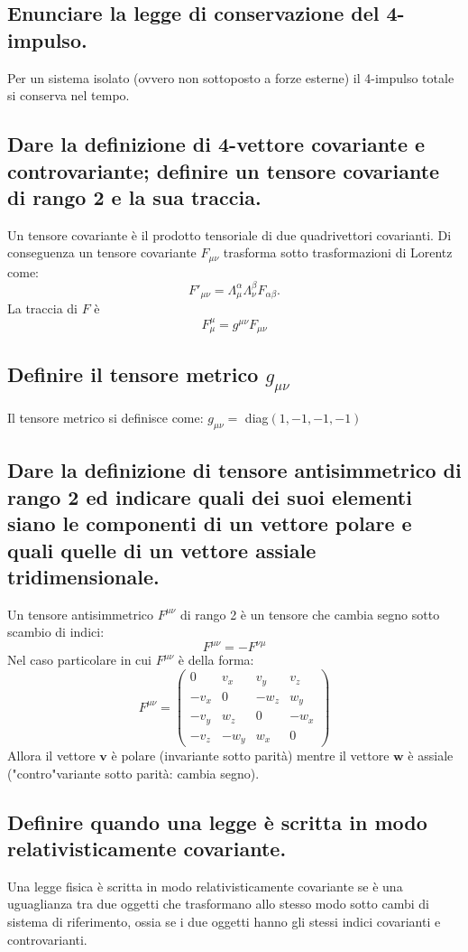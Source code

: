 \subsection[]{ Enunciare la legge di conservazione del 4-impulso.}
Per un sistema isolato (ovvero non sottoposto a forze esterne) il 4-impulso totale si conserva nel tempo.
\subsection[]{ Dare la definizione di 4-vettore covariante e controvariante; definire un tensore covariante di rango 2 e la sua traccia.} 
Un tensore covariante è il prodotto tensoriale di due quadrivettori covarianti. Di conseguenza un tensore covariante $F_{\mu \nu}$ trasforma sotto trasformazioni di Lorentz come:
\[
	F'_{\mu \nu} = \Lambda_{\mu}^{\alpha}\Lambda_{\nu}^{\beta} F_{\alpha \beta}  
.\]
La traccia di $F$ è 
\[
	F^{\mu}_{\mu} = g^{\mu \nu} F_{\mu \nu}
\] 
\subsection[]{ Definire il tensore metrico $g_{\mu \nu}$}
Il tensore metrico si definisce come: $g_{\mu \nu} = $ diag$\left( 1,-1,-1,-1 \right) $ 
\subsection[][Tensore antisimmetrico di rango 2]{  Dare la definizione di tensore antisimmetrico di rango 2 ed indicare quali dei suoi elementi siano le componenti di un vettore polare e quali quelle di un vettore assiale tridimensionale.}
Un tensore antisimmetrico $F^{\mu \nu}$ di rango 2 è un tensore che cambia segno sotto scambio di indici:
\[
	F^{\mu \nu} = -F^{\nu \mu}
\]
Nel caso particolare in cui $F^{\mu \nu}$ è della forma:
\[
	F^{\mu \nu} = 
\left( 
\begin{array}{c|ccc}
	0 & v_{x} & v_{y} & v_{z} \\
	\hline
	-v_{x} & 0 & -w_{z} & w_{y} \\
	-v_{y} & w_{z} & 0 & -w_{x} \\
	-v_{z} & -w_{y} & w_{x} & 0
\end{array}
\right) 
\] 
Allora il vettore $\boldsymbol{v}$ è polare (invariante sotto parità) mentre il vettore $\boldsymbol{w}$ è assiale ("contro"variante sotto parità: cambia segno).
\subsection[]{ Definire quando una legge è scritta in modo relativisticamente covariante.}
Una legge fisica è scritta in modo relativisticamente covariante se è una uguaglianza tra due oggetti che trasformano allo stesso modo sotto cambi di sistema di riferimento, ossia se i due oggetti hanno gli stessi indici covarianti e controvarianti. 

